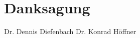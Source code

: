 


\bigskip

\begingroup
\let\clearpage\relax
\let\cleardoublepage\relax
\let\cleardoublepage\relax
\chapter*{Danksagung}
Dr. Dennis Diefenbach
Dr. Konrad Höffner


\endgroup
